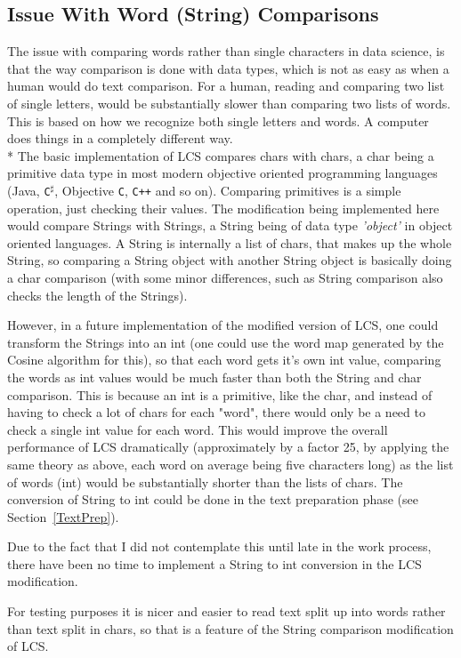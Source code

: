\subsection{Issue With Word (String) Comparisons}
The issue with comparing words rather than single characters in data science, is that the way comparison is done with data types, which is not as easy as when a human would do text comparison. For a human, reading and comparing two list of single letters, would be substantially slower than comparing two lists of words. This is based on how we recognize both single letters and words. A computer does things in a completely different way.\\* The basic implementation of LCS compares chars with chars, a char being a primitive data type in most modern objective oriented programming languages (Java, \verb!C!$^\sharp$, Objective \verb!C!, \verb!C++! and so on). Comparing primitives is a simple operation, just checking their values. The modification being implemented here would compare Strings with Strings, a String being of data type \textit{'object'} in object oriented languages. A String is internally a list of chars, that makes up the whole String, so comparing a String object with another String object is basically doing a char comparison (with some minor differences, such as String comparison also checks the length of the Strings).

However, in a future implementation of the modified version of LCS, one could transform the Strings into an int (one could use the word map generated by the Cosine algorithm for this), so that each word gets it's own int value, comparing the words as int values would be much faster than both the String and char comparison. This is because an int is a primitive, like the char, and instead of having to check a lot of chars for each "word", there would only be a need to check a single int value for each word. This would improve the overall performance of LCS dramatically (approximately by a factor 25, by applying the same theory as above, each word on average being five characters long) as the list of words (int) would be substantially shorter than the lists of chars. 
The conversion of String to int could be done in the text preparation phase (see Section~\ref{TextPrep}).

Due to the fact that I did not contemplate this until late in the work process, there have been no time to implement a String to int conversion in the LCS modification.

For testing purposes it is nicer and easier to read text split up into words rather than text split in chars, so that is a feature of the String comparison modification of LCS.

